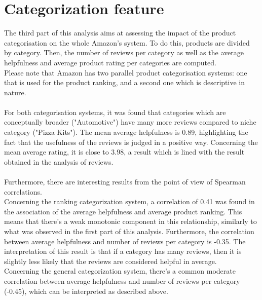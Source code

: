 \documentclass[11pt]{article}
\begin{document}
\section{Categorization feature}
The third part of this analysis aims at assessing the impact of the product categorisation on the whole Amazon's system. To do this, products are divided by category. Then, the number of reviews per category as well as the average helpfulness and average product rating per categories are computed.\\
Please note that Amazon has two parallel product categorisation systems: one that is used for the product ranking, and a second one which is descriptive in nature.\\\\
For both categorisation systems, it was found that categories which are conceptually broader ("Automotive") have many more reviews compared to niche category ("Pizza Kits"). The mean average helpfulness is 0.89, highlighting the fact that the usefulness of the reviews is judged in a positive way. Concerning the mean average rating, it is close to 3.98, a result which is lined with the result obtained in the analysis of reviews.\\\\
Furthermore, there are interesting results from the point of view of Spearman correlations.\\
Concerning the ranking categorization system, a correlation of 0.41 was found in the association of the average helpfulness and average product ranking. This means that there's a weak monotonic component in this relationship, similarly to what was observed in the first part of this analysis. Furthermore, the correlation between average helpfulness and number of reviews per category is -0.35. The interpretation of this result is that if a category has many reviews, then it is slightly less likely that the reviews are considered helpful in average. \\
Concerning the general categorization system, there's a common moderate correlation between average helpfulness and number of reviews per category (-0.45), which can be interpreted as described above.
\end{document}
